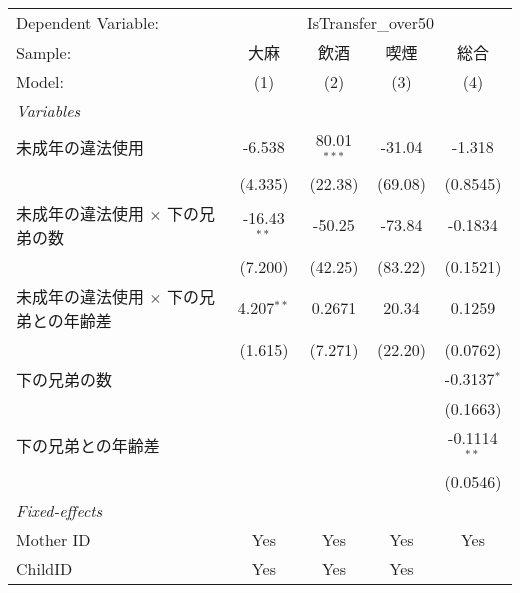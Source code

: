 \documentclass{article}
\begin{document}
\begin{landscape}


\begingroup
\centering
\begin{threeparttable}[b]
   \begin{tabular}{lcccc}
      \tabularnewline \midrule \midrule
      Dependent Variable: & \multicolumn{4}{c}{IsTransfer\_over50}\\
      Sample:                                       & 大麻          & 飲酒          & 喫煙    & 総合 \\   
      Model:                                        & (1)           & (2)           & (3)     & (4)\\  
      \midrule
      \emph{Variables}\\
      未成年の違法使用                              & -6.538        & 80.01$^{***}$ & -31.04  & -1.318\\   
                                                    & (4.335)       & (22.38)       & (69.08) & (0.8545)\\   
      未成年の違法使用 $\times$ 下の兄弟の数        & -16.43$^{**}$ & -50.25        & -73.84  & -0.1834\\   
                                                    & (7.200)       & (42.25)       & (83.22) & (0.1521)\\   
      未成年の違法使用 $\times$ 下の兄弟との年齢差  & 4.207$^{**}$  & 0.2671        & 20.34   & 0.1259\\   
                                                    & (1.615)       & (7.271)       & (22.20) & (0.0762)\\   
      下の兄弟の数                                  &               &               &         & -0.3137$^{*}$\\   
                                                    &               &               &         & (0.1663)\\   
      下の兄弟との年齢差                            &               &               &         & -0.1114$^{**}$\\   
                                                    &               &               &         & (0.0546)\\   
      \midrule
      \emph{Fixed-effects}\\
      Mother ID                                     & Yes           & Yes           & Yes     & Yes\\  
      ChildID                                       & Yes           & Yes           & Yes     & \\  

\end{tabular}
\end{threeparttable}
\end{landscape}
\end{document}
